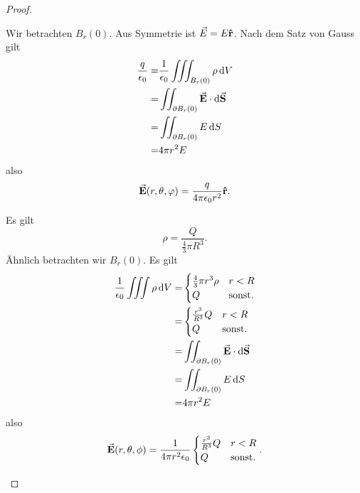 \begin{proof}
\begin{parts}
\item Wir betrachten $B_r(0)$. Aus Symmetrie ist $\vec E=E\vu{r}$. Nach dem Satz von Gauss gilt
\begin{align*}
	\frac{q}{\epsilon_0}=&\frac{1}{\epsilon_0}\iiint_{B_r(0)}\rho\dd{V}\\
	=& \iint_{\partial B_r(0)} \va{E}\cdot \dd{\va S}\\
	=& \iint_{\partial B_r(0)} E\dd{S}\\
	=& 4\pi r^2 E
\end{align*}
also
\[
\va{E}(r,\theta,\varphi)=\frac{q}{4\pi \epsilon_0 r^2}\vu{r}
.\] 
\item Es gilt
	\[
	\rho=\frac{Q}{\frac{4}{3}\pi R^3}
	.\]
	Ähnlich betrachten wir $B_r(0)$. Es gilt
	\begin{align*}
		\frac{1}{\epsilon_0}\iiint \rho\dd{V}=&\begin{cases}
			\frac{4}{3}\pi r^3 \rho & r < R\\
			Q & \text{sonst}.
		\end{cases}\\
		=&\begin{cases}
			\frac{r^3}{R^3}Q & r < R\\
			Q & \text{sonst.}
		\end{cases}\\
		=& \iint_{\partial B_r(0)} \va E\cdot \dd{\va S}\\
		=& \iint_{\partial B_r(0)}E\dd{S}\\ 
		=&4\pi r^2 E
	\end{align*}
	also
	\[
	\va E(r,\theta,\phi)=\frac{1}{4\pi r^2\epsilon_0}\begin{cases}
		\frac{r^3}{R^3}Q & r < R\\
		Q & \text{sonst.}
	\end{cases}
	.\qedhere\] 
\end{parts}
\end{proof}
